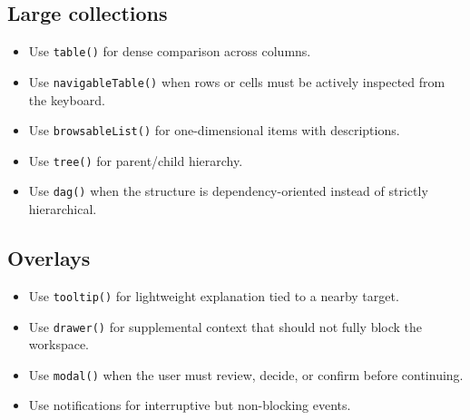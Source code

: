 \subsection{Large collections}\label{record-425-large-collections}

\begin{itemize}
\tightlist
\item
  Use \texttt{t\allowbreak{}a\allowbreak{}b\allowbreak{}l\allowbreak{}e\allowbreak{}(\allowbreak{})} for dense comparison across columns.
\item
  Use \texttt{n\allowbreak{}a\allowbreak{}v\allowbreak{}i\allowbreak{}g\allowbreak{}a\allowbreak{}b\allowbreak{}l\allowbreak{}e\allowbreak{}T\allowbreak{}a\allowbreak{}b\allowbreak{}l\allowbreak{}e\allowbreak{}(\allowbreak{})} when rows or cells must be actively inspected from the keyboard.
\item
  Use \texttt{b\allowbreak{}r\allowbreak{}o\allowbreak{}w\allowbreak{}s\allowbreak{}a\allowbreak{}b\allowbreak{}l\allowbreak{}e\allowbreak{}L\allowbreak{}i\allowbreak{}s\allowbreak{}t\allowbreak{}(\allowbreak{})} for one-dimensional items with descriptions.
\item
  Use \texttt{t\allowbreak{}r\allowbreak{}e\allowbreak{}e\allowbreak{}(\allowbreak{})} for parent/child hierarchy.
\item
  Use \texttt{d\allowbreak{}a\allowbreak{}g\allowbreak{}(\allowbreak{})} when the structure is dependency-oriented instead of strictly hierarchical.
\end{itemize}

\subsection{Overlays}\label{record-425-overlays}

\begin{itemize}
\tightlist
\item
  Use \texttt{t\allowbreak{}o\allowbreak{}o\allowbreak{}l\allowbreak{}t\allowbreak{}i\allowbreak{}p\allowbreak{}(\allowbreak{})} for lightweight explanation tied to a nearby target.
\item
  Use \texttt{d\allowbreak{}r\allowbreak{}a\allowbreak{}w\allowbreak{}e\allowbreak{}r\allowbreak{}(\allowbreak{})} for supplemental context that should not fully block the workspace.
\item
  Use \texttt{m\allowbreak{}o\allowbreak{}d\allowbreak{}a\allowbreak{}l\allowbreak{}(\allowbreak{})} when the user must review, decide, or confirm before continuing.
\item
  Use notifications for interruptive but non-blocking events.
\end{itemize}

